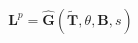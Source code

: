 \documentclass[preview]{standalone}
\begin{document}
\begin{align*}
\mathbf{L}^p = \hat{\mathbf{G}}(\tilde{\mathbf{T}}, \theta, \mathbf{B}, s)
\end{align*}
\end{document}
